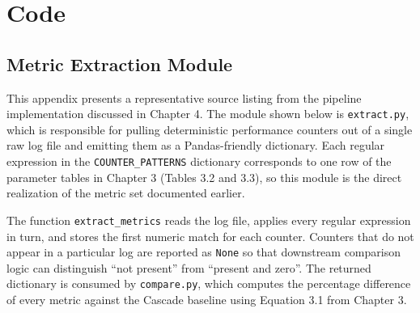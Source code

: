 \chapter{Code}
\section{Metric Extraction Module}
This appendix presents a representative source listing from the pipeline implementation discussed in Chapter 4. The module shown below is \texttt{extract.py}, which is responsible for pulling deterministic performance counters out of a single raw log file and emitting them as a Pandas-friendly dictionary. Each regular expression in the \texttt{COUNTER\_PATTERNS} dictionary corresponds to one row of the parameter tables in Chapter 3 (Tables 3.2 and 3.3), so this module is the direct realization of the metric set documented earlier.

The function \texttt{extract\_metrics} reads the log file, applies every regular expression in turn, and stores the first numeric match for each counter. Counters that do not appear in a particular log are reported as \texttt{None} so that downstream comparison logic can distinguish ``not present'' from ``present and zero''. The returned dictionary is consumed by \texttt{compare.py}, which computes the percentage difference of every metric against the Cascade baseline using Equation 3.1 from Chapter 3.

